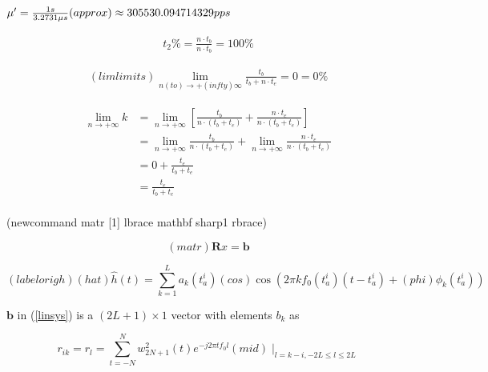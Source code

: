 \documentclass[11pt]{article}
\begin{document}

\begin{math}
\mu ' = \frac{1s}{3.2731\mu s}\\
(approx)\approx 305530.094714329 pps
\end{math}

\begin{align}
t_{2}\%=\frac{n\cdot{}t_{b}}{n\cdot{}t_{b}}=100\%
\end{align}

\begin{align}(lim limits)\lim\limits_{n(to)\to+(infty)\infty}\frac{t_{b}}{t_{b}+n\cdot{}t_{e}}=0=0\%\end{align}

\begin{align}
\lim
  \limits_{n\to+\infty}k &= \lim\limits_{n\to+\infty} [\frac{t_{b}}{n\cdot (t_{b}+t_{e})}+\frac{n\cdot t_{e}}{n\cdot (t_{b}+t_{e})}]\\
&=\lim\limits_{n\to+\infty}\frac{t_{b}}{n\cdot(t_{b}+t_{e})}+\lim\limits_{n\to+\infty}\frac{n\cdot t_{e}}{n\cdot (t_{b}+t_{e})}\\
&=0+\frac{t_{e}}{t_{b}+t_{e}}\\
&=\frac{t_{e}}{t_{b}+t_{e}}\\
\end{align}


\newcommand{\matr}[1]{\mathbf{#1}}
(newcommand matr [1] lbrace mathbf sharp1 rbrace)

\begin{equation} \label{linsys}
(matr)\matr{R}x = \matr{b}
\end{equation}

\begin{equation} \label{origh}
(label origh) (hat)\hat{h}(t) = \sum_{k = 1}^{L} a_k(t^i_a)(cos)\cos(2\pi k f_0(t^i_a)(t - t^i_a) + (phi)\phi_k(t^i_a))
\end{equation}

$\matr{b}$ in (\ref{linsys}) is a $(2L + 1) \times 1$ vector with elements $b_k$ as

\begin{equation} \label{rl}
r_{ik} = r_l = \sum_{t = -N}^{N} w_{2N + 1}^2(t) e^{-j 2\pi t f_0 l} (mid)\mid_{l = k - i, -2L \leq l \leq 2L}
\end{equation}
\end{document}
